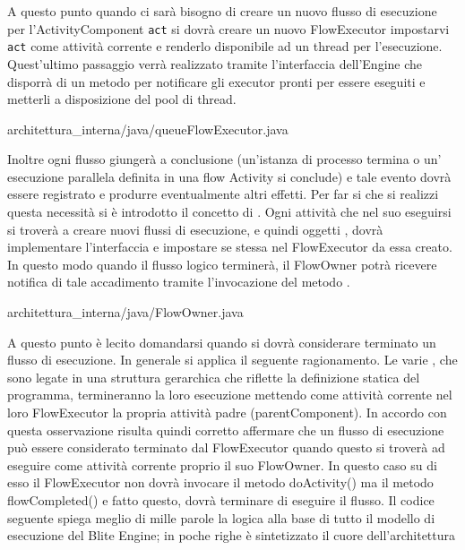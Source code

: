 A questo punto quando ci sarà bisogno di creare un nuovo flusso di esecuzione per
l'ActivityComponent \texttt{act} si dovrà creare un nuovo FlowExecutor
impostarvi \texttt{act} come attività corrente e renderlo disponibile ad un thread per
l'esecuzione. Quest'ultimo passaggio verrà realizzato tramite l'interfaccia
dell'Engine che disporrà di un metodo per notificare gli executor pronti per
essere eseguiti e metterli a disposizione del pool di thread.

 {architettura_interna/java/queueFlowExecutor.java}

Inoltre ogni flusso giungerà a conclusione (un'istanza di processo termina o un'
esecuzione parallela definita in una flow Activity si conclude) e tale evento
dovrà essere registrato e produrre eventualmente altri effetti. Per far si che si
realizzi questa necessità si \`e introdotto il concetto di .
Ogni attività che nel suo eseguirsi si troverà a creare nuovi flussi di
esecuzione, e quindi oggetti ,  dovrà implementare
l'interfaccia  e impostare se stessa nel FlowExecutor da essa
creato. In questo modo quando il flusso logico terminerà, il FlowOwner potrà
ricevere notifica di tale accadimento tramite l'invocazione del metodo
.


{architettura_interna/java/FlowOwner.java}

A questo punto \`e lecito domandarsi quando si dovrà considerare terminato un
flusso di esecuzione. In generale si applica il seguente ragionamento. Le varie
, che sono legate in una struttura gerarchica che
riflette la definizione statica del programma, termineranno la loro esecuzione
mettendo come attività corrente nel loro FlowExecutor la propria attività padre
(parentComponent). In accordo con questa osservazione risulta quindi corretto
affermare che un flusso di esecuzione può essere considerato terminato dal
FlowExecutor quando questo si troverà ad eseguire come attività corrente proprio
il suo FlowOwner. In questo caso su di esso il FlowExecutor non dovrà invocare il
metodo doActivity() ma il metodo flowCompleted() e fatto questo, dovrà terminare
di eseguire il flusso. Il codice seguente spiega meglio di mille parole la logica
alla base di tutto il modello di esecuzione del Blite Engine; in poche righe \`e
sintetizzato il cuore dell'architettura



